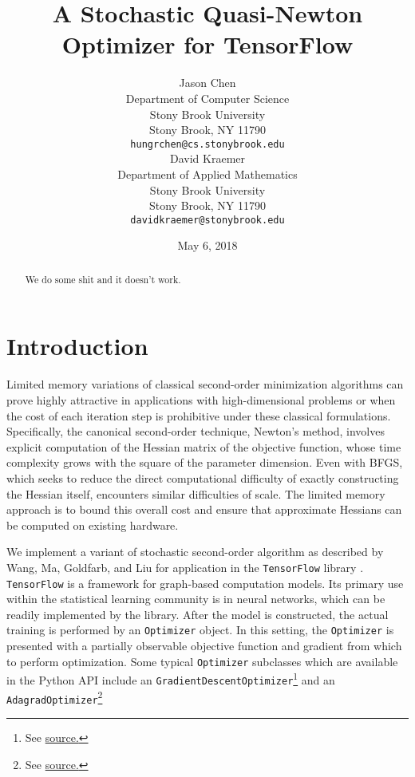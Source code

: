 \documentclass{article}
\title{A Stochastic Quasi-Newton Optimizer for TensorFlow}
\author{
  Jason Chen \\
  Department of Computer Science \\
  Stony Brook University \\
  Stony Brook, NY 11790 \\
  \texttt{hungrchen@cs.stonybrook.edu} \\
  \And
  David Kraemer \\
  Department of Applied Mathematics\\
  Stony Brook University \\
  Stony Brook, NY 11790 \\
  \texttt{davidkraemer@stonybrook.edu}
}
\date{May 6, 2018}
\begin{document}
\maketitle


\begin{abstract}
  We do some shit and it doesn't work.
\end{abstract}


\section{Introduction}




Limited memory variations of classical second-order minimization algorithms can
prove highly attractive in applications with high-dimensional problems or when
the cost of each iteration step is prohibitive under these classical
formulations.  Specifically, the canonical second-order technique, Newton's
method, involves explicit computation of the Hessian matrix of the objective
function, whose time complexity grows with the square of the parameter
dimension. Even with BFGS, which seeks to reduce the direct computational
difficulty of exactly constructing the Hessian itself, encounters similar
difficulties of scale. The limited memory approach is to bound this overall cost
and ensure that approximate Hessians can be computed on existing hardware.

We implement a variant of stochastic second-order algorithm as described by
Wang, Ma, Goldfarb, and Liu \cite{sdlbfgs} for application in the
\texttt{TensorFlow} library \cite{tensorflow}.  \texttt{TensorFlow} is a
framework for graph-based computation models. Its primary use within the
statistical learning community is in neural networks, which can be readily
implemented by the library. After the model is constructed, the actual training
is performed by an \texttt{Optimizer} object. In this setting, the
\texttt{Optimizer} is presented with a partially observable objective function
and gradient from which to perform optimization. Some typical \texttt{Optimizer}
subclasses which are available in the Python API include
an \texttt{GradientDescentOptimizer}\footnote{%
  See
  \href{https://github.com/tensorflow/tensorflow/blob/master/tensorflow/python/training/gradient_descent.py}{source.}
}%
and an \texttt{AdagradOptimizer}\footnote{%
  See \href{https://github.com/tensorflow/tensorflow/blob/master/tensorflow/python/training/adagrad.py}{source.}
}%
\end{document}
